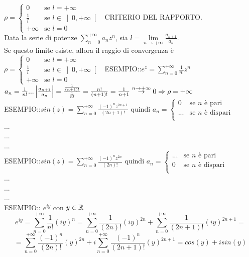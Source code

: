 $\rho =
	\begin{cases}
		0				&	\text{se }l=+\infty\\
		\frac{1}{l} 	&	\text{se }l\in\left]0,+\infty\right[\\
		+\infty 		& 	\text{se }l=0
	\end{cases}
$
\proposition CRITERIO DEL RAPPORTO.\\
Data la serie di potenze $\sum\limits_{n=0}^{+\infty}a_nz^n$, sia $l=\lim\limits_{n\to+\infty}\frac{a_{n+1}}{a_n}$.\\
Se questo limite esiste, allora il raggio di convergenza è
$\rho =
\begin{cases}
0				&	\text{se }l=+\infty\\
\frac{1}{l} 	&	\text{se }l\in\left]0,+\infty\right[\\
+\infty 		& 	\text{se }l=0
\end{cases}
$
ESEMPIO::$e^z=\sum\limits_{n=0}^{+\infty}\frac{1}{n!}z^n$\\
$a_n=\frac{1}{n!} ...  \left|\frac{a_{n+1}}{a_n}\right|=\frac{\frac{1}{(n+1)!}}{\frac{1}{n!}}=\frac{n!}{(n+1)!}=\frac{1}{n+1}\overset{n\to+\infty}{\to}0 \Rightarrow \rho=+\infty$\\
ESEMPIO::$sin(z)=\sum\limits_{n=0}^{+\infty}\frac{(-1)^nz^{2n+1}}{(2n+1)!}$ quindi
$a_n =
\begin{cases}
0		&	\text{se }n\text{ è pari}\\
...		&	\text{se }n\text{ è dispari}\\
\end{cases}
$\\
...\\
...\\
...\\
ESEMPIO::$sin(z)=\sum\limits_{n=0}^{+\infty}\frac{(-1)^nz^{2n}}{(2n)!}$ quindi
$a_n =
\begin{cases}
...		&	\text{se }n\text{ è pari}\\
0		&	\text{se }n\text{ è dispari}\\
\end{cases}
$\\
...\\
...\\
...\\
ESEMPIO:: $e^{iy}$ con $y\in \mathbb{R}$
$$e^{iy} = \sum\limits_{n=0}^{+\infty}\frac{1}{n!}(iy)^n = \sum\limits_{n=0}^{+\infty}\frac{1}{(2n)!}(iy)^{2n} + \sum\limits_{n=0}^{+\infty}\frac{1}{(2n+1)!}(iy)^{2n+1} = $$
$$ = \sum\limits_{n=0}^{+\infty}\frac{(-1)^n}{(2n)!}(y)^{2n} + i\sum\limits_{n=0}^{+\infty}\frac{(-1)^n}{(2n+1)!}(y)^{2n+1} = cos(y)+isin(y)$$
